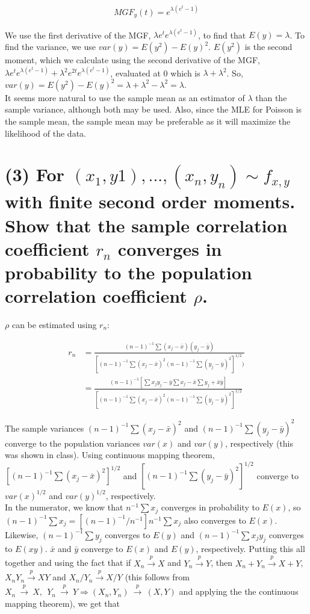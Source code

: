 \documentclass[11pt]{article}
\begin{document}
\begin{align*}
    MGF_y(t) = e^{\lambda(e^t-1)}
\end{align*}

We use the first derivative of the MGF, $\lambda e^{t}e^{\lambda(e^t-1)}$, to find that $E(y) = \lambda$. To find the variance, we use $var(y) = E(y^2)-E(y)^2$. $ E(y^2)$ is the second moment, which we calculate using the second derivative of the MGF,  $\lambda e^t e^{\lambda(e^t-1)}+\lambda^2e^{2t}e^{\lambda(e^t-1)}$, evaluated at 0 which is $\lambda + \lambda^2$. So, $var(y) = E(y^2)-E(y)^2 =\lambda + \lambda^2 - \lambda^2=\lambda$.\\

It seems more natural to use the sample mean as an estimator of $\lambda$ than the sample variance, although both may be used. Also, since the MLE for Poisson is the sample mean, the sample mean may be preferable as it will maximize the likelihood of the data.

\section*{(3) For $(x_1, y1), ... , (x_n, y_n) \sim f_{x,y}$ with finite second order moments. Show that the sample correlation coefficient $r_n$ converges in probability to the population correlation coefficient $\rho$.}


$\rho$ can be estimated using $r_n$:

\begin{align*}
    r_n &= \frac{(n-1)^{-1}\sum (x_j-\bar{x})(y_j-\bar{y})}{[(n-1)^{-1}\sum (x_j-\bar{x})^2 (n-1)^{-1}\sum (y_j-\bar{y})^2]^{1/2}) }\\
    &=\frac{(n-1)^{-1}[\sum x_j y_j - \bar{y}\sum x_j - \bar{x}\sum y_j + \bar{x}\bar{y}]}{[(n-1)^{-1}\sum (x_j-\bar{x})^2 (n-1)^{-1}\sum (y_j-\bar{y})^2]^{1/2}}
\end{align*}

The sample variances $(n-1)^{-1}\sum (x_j-\bar{x})^2$ and $(n-1)^{-1}\sum (y_j-\bar{y})^2$ converge to the population variances $var(x)$ and $var(y)$, respectively (this was shown in class). Using continuous mapping theorem, $[(n-1)^{-1}\sum (x_j-\bar{x})^2]^{1/2}$ and $[(n-1)^{-1}\sum (y_j-\bar{y})^2]^{1/2}$ converge to $var(x)^{1/2}$ and $var(y)^{1/2}$, respectively.\\

In the numerator, we know that $n^{-1} \sum x_j$ converges in probability to $E(x)$, so $(n-1)^{-1} \sum x_j = [(n-1)^{-1}/n^{-1}] n^{-1} \sum x_j$ also converges to $E(x)$. Likewise, $(n-1)^{-1} \sum y_j$ converges to $E(y)$ and $(n-1)^{-1} \sum x_j y_j$ converges to $E(xy)$. $\bar{x}$ and $\bar{y}$ converge to $E(x)$ and $E(y)$, respectively. Putting this all together
and using the fact that  if $X_{n} \xrightarrow {\overset {}{p}} X$ and  $Y_{n} \xrightarrow {\overset {}{p}} Y$, then $X_{n} + Y_{n} \xrightarrow {\overset {}{p}} X + Y$, $X_{n} Y_{n} \xrightarrow {\overset {}{p}} X Y$  and $X_{n} /Y_{n} \xrightarrow {\overset {}{p}} X/ Y$ (this follows from ${\displaystyle X_{n}\ {\xrightarrow {\overset {}{p}}}\ X,\ \ Y_{n}\ {\xrightarrow {\overset {}{p}}}\ Y \Rightarrow(X_{n},Y_{n})\ {\xrightarrow {\overset {}{p}}}\ (X,Y)}$ and applying the the continuous mapping theorem), we get that 
\end{document}
